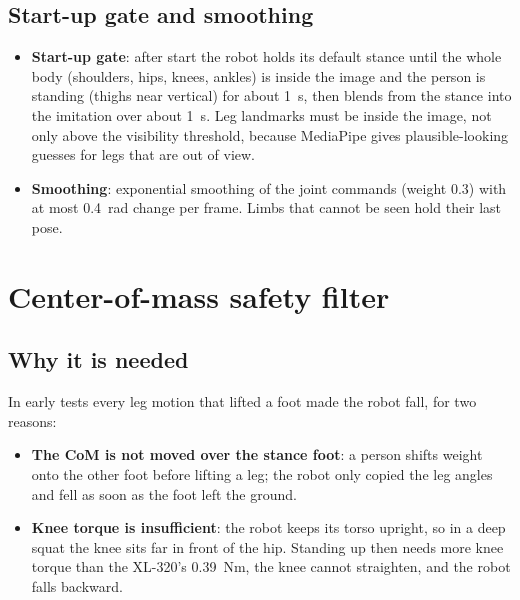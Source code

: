 \documentclass[11pt,a4paper]{article}
\begin{document}
\subsection{Start-up gate and smoothing}
\begin{itemize}
  \item \textbf{Start-up gate}: after start the robot holds its default stance until the whole body (shoulders, hips, knees, ankles) is inside the image and the person is standing (thighs near vertical) for about 1~s, then blends from the stance into the imitation over about 1~s. Leg landmarks must be inside the image, not only above the visibility threshold, because MediaPipe gives plausible-looking guesses for legs that are out of view.
  \item \textbf{Smoothing}: exponential smoothing of the joint commands (weight 0.3) with at most 0.4~rad change per frame. Limbs that cannot be seen hold their last pose.
\end{itemize}

\section{Center-of-mass safety filter}
\label{sec:balance}

\subsection{Why it is needed}
In early tests every leg motion that lifted a foot made the robot fall, for two reasons:
\begin{itemize}
  \item \textbf{The CoM is not moved over the stance foot}: a person shifts weight onto the other foot before lifting a leg; the robot only copied the leg angles and fell as soon as the foot left the ground.
  \item \textbf{Knee torque is insufficient}: the robot keeps its torso upright, so in a deep squat the knee sits far in front of the hip. Standing up then needs more knee torque than the XL-320's 0.39~Nm, the knee cannot straighten, and the robot falls backward.
\end{itemize}
\end{document}
